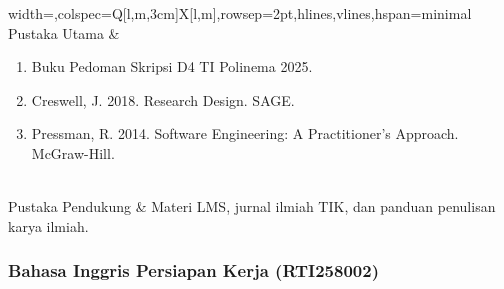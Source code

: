 \begin{longtblr}{width=\textwidth,colspec={Q[l,m,3cm]X[l,m]},rowsep=2pt,hlines,vlines,hspan=minimal}
Pustaka Utama & \begin{enumerate}\item Buku Pedoman Skripsi D4 TI Polinema 2025.\item Creswell, J. 2018. Research Design. SAGE.\item Pressman, R. 2014. Software Engineering: A Practitioner's Approach. McGraw-Hill.\end{enumerate} \\
Pustaka Pendukung &  Materi LMS, jurnal ilmiah TIK, dan panduan penulisan karya ilmiah. \\
\end{longtblr}

\subsubsection*{Bahasa Inggris Persiapan Kerja (RTI258002)}

